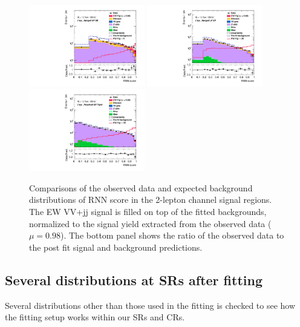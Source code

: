 \begin{figure}[]
    \centering
    \includegraphics[width=0.45\textwidth]{figures/PostFit/Region_distRNNScoreMerged_DSRVBSHP_BMin0_J0_incJet1_L2_T0_incFat1_Y6051_incTag1_Fat1_GlobalFit_unconditionnal_mu1log}
    \includegraphics[width=0.45\textwidth]{figures/PostFit/Region_distRNNScoreMerged_DSRVBSLP_BMin0_J0_incJet1_L2_T0_incFat1_Y6051_incTag1_Fat1_GlobalFit_unconditionnal_mu1log}
    \includegraphics[width=0.45\textwidth]{figures/PostFit/Region_distRNNScoreResolved_DSRVBSFid_BMin0_T0_Y6051_incTag1_J2_L2_incJet1_GlobalFit_unconditionnal_mu1log}
    \caption{Comparisons of the observed data and expected background distributions of RNN score in the 2-lepton channel signal regions. The EW VV+jj signal is filled on top of the fitted backgrounds, normalized to the signal yield extracted from the observed data ($\mu = 0.98$). The bottom panel shows the ratio of the observed data to the post fit signal and background predictions.}
    \label{fig:postSR2lep}
\end{figure}

\subsection{Several distributions at SRs after fitting}
Several distributions other than those used in the fitting is checked to see how the fitting setup works within our SRs and CRs.

